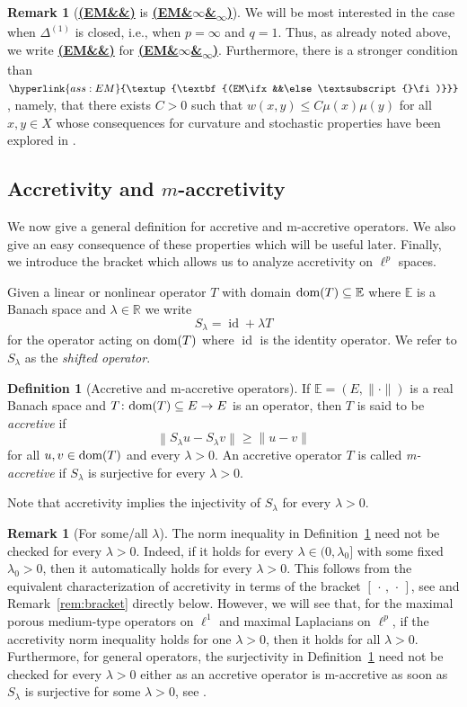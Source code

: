 \documentclass[letterpaper]{article}
\theoremstyle{definition}
\newtheorem{definition}[lemma]{Definition}
\newtheorem{remark}[lemma]{Remark}
\theoremstyle{named}
\numberwithin{equation}{section}
\newcommand{\EM}[1][]{\hyperlink{ass:EM}{\textup{\textbf{(EM\ifx&#1&\else\textsubscript{#1}\fi)}}}}
\newcommand{\R}{\mathbb{R}}
\newcommand{\lm}{\lambda}
\newcommand{\dom}{\textnormal{dom}} %
\newcommand{\id}{\operatorname{id}}
\begin{document}
\begin{remark}[{\EM[] is \EM[$\infty$]}]\label{rem:EMp_p1}
We will be most
interested in the case when $\Delta^{(1)}$ is closed, i.e., 
when $p=\infty$ and $q=1$. Thus, as already noted above,
we write \EM[] for \EM[$\infty$]. 
Furthermore, there is a stronger condition than $\EM$, 
namely, that there exists $C>0$ such that $w(x,y) \leq C \mu(x) \mu(y)$
for all $x, y \in X$ whose consequences for curvature and stochastic properties have 
been explored in \cite{KM24, KMW25}.
\end{remark}



\subsection{Accretivity and \texorpdfstring{$m$}{m}-accretivity}
We now give a general definition for accretive and m-accretive operators. We also give an easy consequence of these properties 
which will be useful later. Finally, we introduce the bracket which allows us to
analyze accretivity on $\ell^p$ spaces.

Given a linear or nonlinear operator $T$ with domain 
$\dom(T) \subseteq \mathbb{E}$ where $\mathbb{E}$ is a 
Banach space and $\lambda \in \R$ we write
$$
S_\lambda = \id +\lambda T
$$
for the operator acting on $\dom(T)$
where $\id$ is the identity operator. We refer to $S_\lm$ as the \emph{shifted operator}.
\begin{definition}[Accretive and m-accretive operators]\label{def:m-accretivity}
If $\mathbb{E}=(E,\|\cdot\|)$ is a real Banach space and  $T \colon \dom(T)\subseteq E \to E$ is an operator, then $T$ is said to be \emph{accretive} if
$$ \left\|S_\lambda u - S_\lambda v \right\|\geq \|u - v\|$$	
for all $u,v \in \dom (T)$ and every $\lambda >0$.
An accretive operator $T$ is called \emph{m-accretive} if $S_\lambda$ is surjective for every $\lambda >0$. 
\end{definition}

Note that accretivity implies the injectivity of $S_\lambda$ for every $\lambda >0$.
\begin{remark}[For some/all $\lm$]\label{rem:lambda}
	The norm inequality in Definition~\ref{def:m-accretivity} need not be checked for every $\lambda>0$. Indeed, if it holds for every $\lambda\in(0,\lambda_0]$ with some fixed $\lambda_0>0$, 
    then it automatically holds for every $\lambda>0$. 
    This follows from the equivalent characterization of accretivity in terms of the bracket $[\,\cdot\,,\,\cdot\,]$, see \cite[II.~Proposition~2.5]{benilan1988evolution} and Remark~\ref{rem:bracket}
    directly below. 
    However, we will see that, for the maximal porous medium-type
    operators on $\ell^1$ and maximal Laplacians on $\ell^p$, if the accretivity norm
    inequality holds
    for one $\lm>0$, then it holds for all $\lm>0$.
    Furthermore, for general operators, 
    the surjectivity in Definition~\ref{def:m-accretivity} need not be checked 
    for every $\lambda>0$ either as an accretive operator 
    is m-accretive as soon as $S_\lambda$ is surjective for some $\lambda>0$, see \cite[Proposition~3.3]{barbu2010nonlinear}.
\end{remark}
\end{document}
